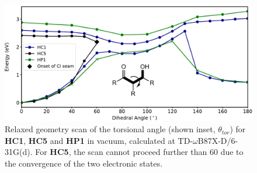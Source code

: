 \begin{figure}[t]
\centering
  \includegraphics[width=0.8\linewidth]{5ConnectingCrystalStructure/dihedral_scans_vac}
  \caption[Relaxed geometry scan of the torsional angle]{Relaxed geometry scan of the torsional angle (shown inset, $\theta_{tor}$)  for \textbf{HC1}, \textbf{HC5} and \textbf{HP1} in vacuum, calculated at TD-$\omega$B87X-D/6-31G(d). For \textbf{HC5}, the scan cannot proceed further than 60\degree{} due to the convergence of the two electronic states.}
  \label{figure: dihedral_scans_vac}
\end{figure}

